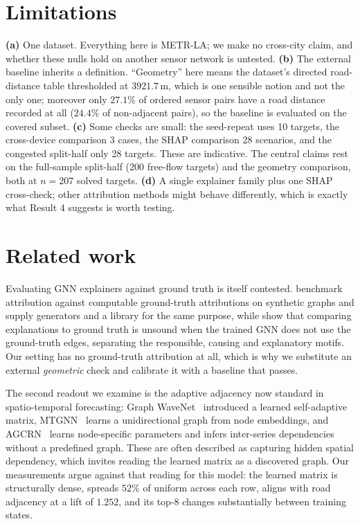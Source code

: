 \documentclass{article}
\begin{document}
\section{Limitations}

\textbf{(a)} One dataset. Everything here is METR-LA; we make no cross-city claim,
and whether these nulls hold on another sensor network is untested. \textbf{(b)} The
external baseline inherits a definition. ``Geometry'' here means the dataset's
directed road-distance table thresholded at $3921.7$\,m, which is one sensible notion
and not the only one; moreover only $27.1\%$ of ordered sensor pairs have a road
distance recorded at all ($24.4\%$ of non-adjacent pairs), so the baseline is
evaluated on the covered subset. \textbf{(c)} Some checks are small: the seed-repeat
uses 10 targets, the cross-device comparison 3 cases, the SHAP comparison 28
scenarios, and the congested split-half only 28 targets. These are indicative. The
central claims rest on the full-sample split-half (200 free-flow targets) and the
geometry comparison, both at $n{=}207$ solved targets. \textbf{(d)} A single
explainer family plus one SHAP cross-check; other attribution methods might behave
differently, which is exactly what Result 4 suggests is worth testing.

\section{Related work}

Evaluating GNN explainers against ground truth is itself contested.
\citet{sanchez2020evaluating} benchmark attribution against computable ground-truth
attributions on synthetic graphs and \citet{agarwal2023evaluating} supply generators
and a library for the same purpose, while \citet{faber2021ground} show that comparing
explanations to ground truth is unsound when the trained GNN does not use the
ground-truth edges, separating the responsible, causing and explanatory motifs. Our
setting has no ground-truth attribution at all, which is why we substitute an
external \emph{geometric} check and calibrate it with a baseline that passes.

The second readout we examine is the adaptive adjacency now standard in
spatio-temporal forecasting: Graph WaveNet~\citep{gwnet2019} introduced a learned
self-adaptive matrix, MTGNN~\citep{wu2020connecting} learns a unidirectional graph
from node embeddings, and AGCRN~\citep{bai2020adaptive} learns node-specific
parameters and infers inter-series dependencies without a predefined graph. These are
often described as capturing hidden spatial dependency, which invites reading the
learned matrix as a discovered graph. Our measurements argue against that reading for
this model: the learned matrix is structurally dense, spreads $52\%$ of uniform
across each row, aligns with road adjacency at a lift of $1.252$, and its top-8
changes substantially between training states.
\end{document}
